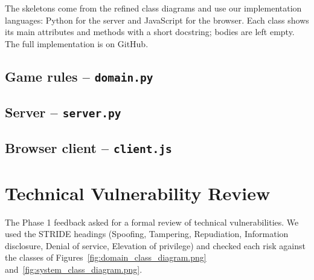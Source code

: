 \documentclass[11pt,a4paper]{article}
\begin{document}
The skeletons come from the refined class diagrams and use our implementation languages: Python for the server and JavaScript for the browser. Each class shows its main attributes and methods with a short docstring; bodies are left empty. The full implementation is on GitHub.

\subsection{Game rules -- \texttt{domain.py}}

\subsection{Server -- \texttt{server.py}}

\subsection{Browser client -- \texttt{client.js}}


\section{Technical Vulnerability Review}\label{sec:vuln}

The Phase 1 feedback asked for a formal review of technical vulnerabilities. We used the STRIDE headings (Spoofing, Tampering, Repudiation, Information disclosure, Denial of service, Elevation of privilege) and checked each risk against the classes of Figures~\ref{fig:domain_class_diagram.png} and~\ref{fig:system_class_diagram.png}.
\end{document}
